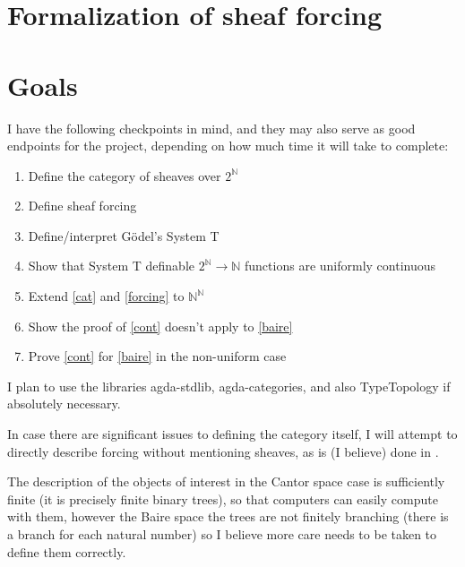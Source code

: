 \documentclass{article}
\begin{document}
\section{Formalization of sheaf forcing}






\section{Goals}

I have the following checkpoints in mind, and they may also serve as good endpoints for the project,
depending on how much time it will take to complete:
\begin{enumerate}[(1)]
	\item\label{cat} Define the category of sheaves over $2^ℕ$
	\item\label{forcing} Define sheaf forcing
	\item\label{syst} Define/interpret Gödel's System T
	\item\label{cont} Show that System T definable $2^ℕ → ℕ$ functions are uniformly continuous
	\item\label{baire} Extend \ref{cat} and \ref{forcing} to $ℕ^ℕ$
	\item Show the proof of \ref{cont} doesn't apply to \ref{baire}
	\item Prove \ref{cont} for \ref{baire} in the non-uniform case
\end{enumerate}

I plan to use the libraries agda-stdlib\cite{stdlib}, agda-categories\cite{catlib}, and also TypeTopology\cite{tytop} if absolutely necessary.

In case there are significant issues to defining the category itself,
I will attempt to directly describe forcing without mentioning sheaves,
as is (I believe) done in \cite{coquand}.

The description of the objects of interest in the Cantor space case is sufficiently finite
(it is precisely finite binary trees), so that computers can easily compute with them,
however the Baire space the trees are not finitely branching
(there is a branch for each natural number) so I believe more care needs
to be taken to define them correctly.

\printbibliography
\end{document}

